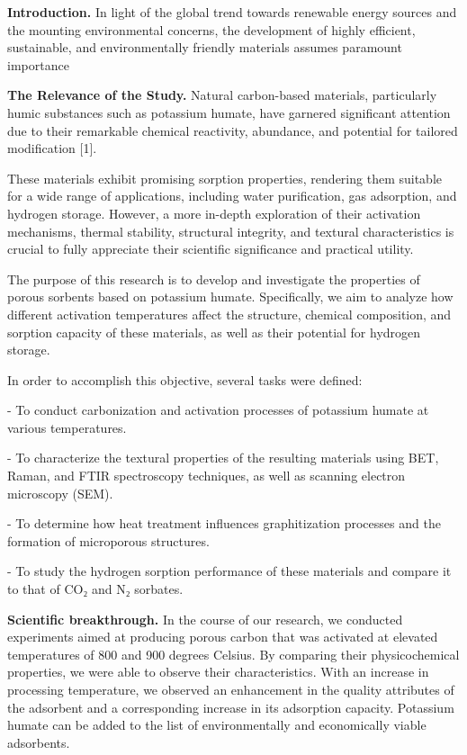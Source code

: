 \begin{multicols}{2}
{\bfseries Introduction.} In light of the global trend towards renewable
energy sources and the mounting environmental concerns, the development
of highly efficient, sustainable, and environmentally friendly materials
assumes paramount importance

{\bfseries The Relevance of the Study.} Natural carbon-based materials,
particularly humic substances such as potassium humate, have garnered
significant attention due to their remarkable chemical reactivity,
abundance, and potential for tailored modification {[}1{]}.

These materials exhibit promising sorption properties, rendering them
suitable for a wide range of applications, including water purification,
gas adsorption, and hydrogen storage. However, a more in-depth
exploration of their activation mechanisms, thermal stability,
structural integrity, and textural characteristics is crucial to fully
appreciate their scientific significance and practical utility.

The purpose of this research is to develop and investigate the
properties of porous sorbents based on potassium humate. Specifically,
we aim to analyze how different activation temperatures affect the
structure, chemical composition, and sorption capacity of these
materials, as well as their potential for hydrogen storage.

In order to accomplish this objective, several tasks were defined:

- To conduct carbonization and activation processes of potassium humate
at various temperatures.

- To characterize the textural properties of the resulting materials
using BET, Raman, and FTIR spectroscopy techniques, as well as
scanning electron microscopy (SEM).

- To determine how heat treatment influences graphitization processes
and the formation of microporous structures.

- To study the hydrogen sorption performance of these materials and
compare it to that of CO₂ and N₂ sorbates.

{\bfseries Scientific breakthrough.} In the course of our research, we
conducted experiments aimed at producing porous carbon that was
activated at elevated temperatures of 800 and 900 degrees Celsius. By
comparing their physicochemical properties, we were able to observe
their characteristics. With an increase in processing temperature, we
observed an enhancement in the quality attributes of the adsorbent and a
corresponding increase in its adsorption capacity. Potassium humate can
be added to the list of environmentally and economically viable
adsorbents.


\end{multicols}
